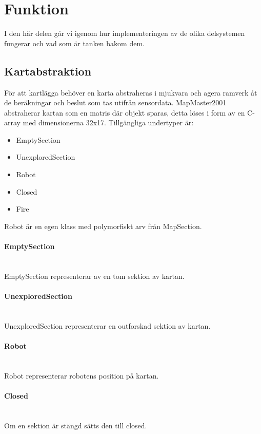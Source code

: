 \documentclass[a4paper,12pt,fleqn]{article}
\begin{document}
\newpage
\section{Funktion}

I den här delen går vi igenom hur implementeringen av de olika delsystemen fungerar och vad som är tanken bakom dem. 


\subsection{Kartabstraktion}
För att kartlägga behöver en karta abstraheras i mjukvara och agera ramverk åt de beräkningar och beslut som tas utifrån sensordata. MapMaster2001 abstraherar kartan som en matris där objekt sparas, detta löses i form av en C-array med dimensionerna 32x17. Tillgängliga undertyper är:

\begin{itemize}
\item{EmptySection}
\item{UnexploredSection}
\item{Robot}
\item{Closed}
\item{Fire}
\end{itemize}

Robot är en egen klass med polymorfiskt arv från MapSection. 

\paragraph{EmptySection} 
~\\
EmptySection representerar av en tom sektion av kartan. 

\paragraph{UnexploredSection} 
~\\
UnexploredSection representerar en outforskad sektion av kartan. 

\paragraph{Robot} 
~\\
Robot representerar robotens position på kartan. 

\paragraph{Closed} 
~\\
Om en sektion är stängd sätts den till closed.
\end{document}
